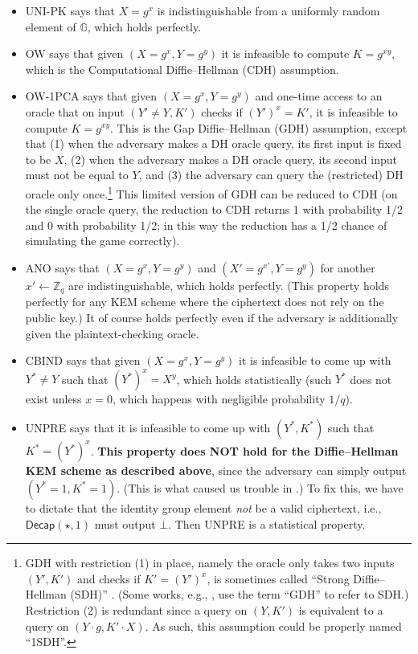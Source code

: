 \documentclass{article}
\theoremstyle{plain}
\theoremstyle{definition}
\theoremstyle{remark}
\newcommand{\group}{\mathbb{G}}
\newcommand{\Decap}{\mathsf{Decap}}
\begin{document}
\begin{itemize}
  \item UNI-PK says that $X = g^x$ is indistinguishable from a uniformly random element of $\group$, which holds perfectly.
  \item OW says that given $(X = g^x, Y = g^y)$ it is infeasible to compute $K = g^{xy}$, which is the Computational Diffie--Hellman (CDH) assumption.
  \item OW-1PCA says that given $(X = g^x, Y = g^y)$ and one-time access to an oracle that on input $(Y' \neq Y, K')$ checks if $(Y')^x = K'$, it is infeasible to compute $K = g^{xy}$. This is the Gap Diffie--Hellman (GDH) assumption, except that (1) when the adversary makes a DH oracle query, its first input is fixed to be $X$, (2) when the adversary makes a DH oracle query, its second input must not be equal to $Y$, and (3) the adversary can query the (restricted) DH oracle only once.\footnote{GDH with restriction (1) in place, namely the oracle only takes two inputs $(Y',K')$ and checks if $K' = (Y')^x$, is sometimes called ``Strong Diffie--Hellman (SDH)'' \cite[Definition~9]{RSA:AbdBelRog01}. (Some works, e.g., \cite[Section~2]{CiC:LLMT25}, use the term ``GDH'' to refer to SDH.) Restriction (2) is redundant since a query on $(Y,K')$ is equivalent to a query on $(Y \cdot g, K' \cdot X)$. As such, this assumption could be properly named ``1SDH''.} This limited version of GDH can be reduced to CDH (on the single oracle query, the reduction to CDH returns 1 with probability 1/2 and 0 with probability 1/2; in this way the reduction has a 1/2 chance of simulating the game correctly).
  \item ANO says that $(X = g^x, Y = g^y)$ and $(X' = g^{x'}, Y = g^y)$ for another $x' \gets \mathbb{Z}_q$ are indistinguishable, which holds perfectly. (This property holds perfectly for any KEM scheme where the ciphertext does not rely on the public key.) It of course holds perfectly even if the adversary is additionally given the plaintext-checking oracle.
  \item CBIND says that given $(X = g^x, Y = g^y)$ it is infeasible to come up with $Y^* \neq Y$ such that $(Y^*)^x = X^y$, which holds statistically (such $Y^*$ does not exist unless $x = 0$, which happens with negligible probability $1/q$).
  \item UNPRE says that it is infeasible to come up with $(Y^*,K^*)$ such that $K^* = (Y^*)^x$. \textbf{This property does NOT hold for the Diffie--Hellman KEM scheme as described above}, since the adversary can simply output $(Y^* = 1, K^* = 1)$. (This is what caused us trouble in .) To fix this, we have to dictate that the identity group element \emph{not} be a valid ciphertext, i.e., $\Decap(\star,1)$ must output $\bot$. Then UNPRE is a statistical property.

\end{itemize}
\end{document}
